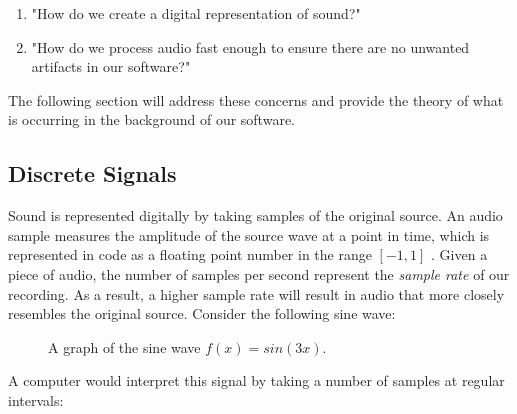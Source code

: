 \documentclass[12pt]{article}
\begin{document}
\begin{enumerate}
	\item "How do we create a digital representation of sound?"
	\item "How do we process audio fast enough to ensure there are no unwanted artifacts in our software?"
\end{enumerate}

The following section will address these concerns and provide the theory of what is occurring in the background of our software.

\subsection{Discrete Signals}
Sound is represented digitally by taking samples of the original source. An audio sample measures the amplitude of the source wave at a point in time, which is represented in code as a floating point number in the range \([-1, 1]\) \cite{Doumler}. Given a piece of audio, the number of samples per second represent the \textit{sample rate} of our recording. As a result, a higher sample rate will result in audio that more closely resembles the original source. Consider the following sine wave:

\begin{figure}[h] %
\begin{center}
	\caption{A graph of the sine wave \(f(x) = sin(3x)\).}
\end{center}
\end{figure}

\newpage

A computer would interpret this signal by taking a number of samples at regular intervals:
\end{document}
